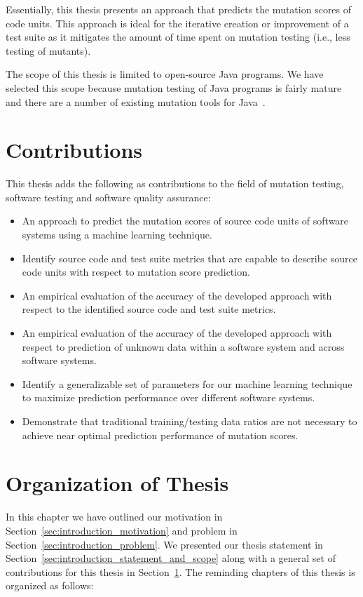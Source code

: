 Essentially, this thesis presents an approach that predicts the mutation scores of code units. This approach is ideal for the iterative creation or improvement of a test suite as it mitigates the amount of time spent on mutation testing (i.e., less testing of mutants).

The scope of this thesis is limited to open-source Java programs. We have selected this scope because mutation testing of Java programs is fairly mature and there are a number of existing mutation tools for Java~\cite{JH10}.


\section{Contributions}
\label{sec:introduction_contributions}
This thesis adds the following as contributions to the field of mutation testing, software testing and software quality assurance:

\begin{itemize}
  \item An approach to predict the mutation scores of source code units of software systems using a machine learning technique.
  \item Identify source code and test suite metrics that are capable to describe source code units with respect to mutation score prediction.
  \item An empirical evaluation of the accuracy of the developed approach with respect to the identified source code and test suite metrics.
  \item An empirical evaluation of the accuracy of the developed approach with respect to prediction of unknown data within a software system and across software systems.
  \item Identify a generalizable set of parameters for our machine learning technique to maximize prediction performance over different software systems.
  \item Demonstrate that traditional training/testing data ratios are not necessary to achieve near optimal prediction performance of mutation scores.
\end{itemize}


\section{Organization of Thesis}
\label{sec:introduction_organization}
In this chapter we have outlined our motivation in Section~\ref{sec:introduction_motivation} and problem in Section~\ref{sec:introduction_problem}. We presented our thesis statement in Section~\ref{sec:introduction_statement_and_scope} along with a general set of contributions for this thesis in Section~\ref{sec:introduction_contributions}. The reminding chapters of this thesis is organized as follows:

